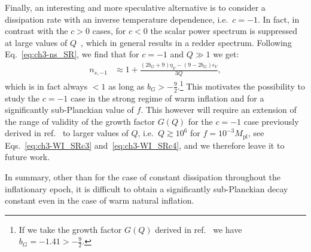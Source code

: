 Finally, an interesting and more speculative alternative is to consider a dissipation rate with an inverse temperature dependence, i.e.\ $c=-1$. In fact, in contrast with the $c>0$ cases, for $c<0$ the scalar power spectrum is suppressed at large values of $Q$~\cite{Bastero-Gil:2011rva}, which in general results in a redder spectrum. Following Eq.~\ref{eq:ch3-ns_SR}, we find that for $c=-1$ and $Q\gg 1$ we get:
\begin{align}
    n_{s,-1}&\approx 1+ \frac{(2b_G+9)\eta_V -(9-2b_G)\epsilon_V}{3Q}, \label{eq:ch3-ns_c-1}
\end{align}
which is in fact always $<1$ as long as $b_G>-\frac{9}{2}$.\footnote{If we take the growth factor $G(Q)$ derived in ref.~\cite{Motaharfar:2018zyb} we have $b_G=-1.41>-\frac{9}{2}$.} This motivates the possibility to study the $c=-1$ case in the strong regime of warm inflation and for a significantly sub-Planckian value of $f$. This however will require an extension of the range of validity of the growth factor $G(Q)$ for the $c=-1$ case previously derived in ref.~\cite{Motaharfar:2018zyb} to larger values of $Q$, i.e.\ $Q\gtrsim 10^{6}$ for $f=10^{-3}M_\mathrm{pl}$, see Eqs.~\ref{eq:ch3-WI_SRc3} and~\ref{eq:ch3-WI_SRc4}, and we therefore leave it to future work.

In summary, other than for the case of constant dissipation throughout the inflationary epoch, it is difficult to obtain a significantly sub-Planckian decay constant even in the case of warm natural inflation.


